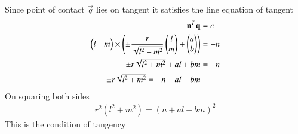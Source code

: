 \documentclass[journal,12pt,twocolumn]{IEEEtran}
\begin{document}
Since point of contact $\vec{q}$ lies on tangent it satisfies the line equation of tangent
\begin{align}
    \mathbf{n}^T\mathbf{q} &= c\\
    \begin{pmatrix}l&m\end{pmatrix}\times \left(
    \pm\frac{r}{\sqrt{l^2+m^2}}\begin{pmatrix}l\\m\end{pmatrix}+\begin{pmatrix}a\\b\end{pmatrix}\right)&=-n\\
    \pm r\sqrt{l^2+m^2}+al+bm &= -n\\
    \pm r\sqrt{l^2+m^2} = -n-al-bm
\end{align}
On squaring both sides
\begin{align}
    r^2(l^2+m^2)=(n+al+bm)^2
\end{align} 
This is the condition of tangency
\end{document}
